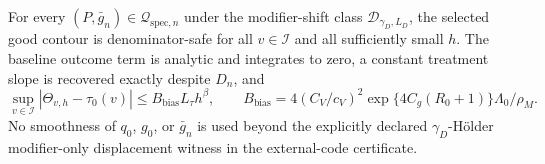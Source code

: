 For every \((P,\bar g_n)\in\mathcal Q_{\mathrm{spec},n}\) under the modifier-shift class \(\mathcal D_{\gamma_D,L_D}\), the selected good contour is denominator-safe for all \(v\in\mathcal I\) and all sufficiently small \(h\). The baseline outcome term is analytic and integrates to zero, a constant treatment slope is recovered exactly despite \(D_n\), and
\[
 \sup_{v\in\mathcal I}|\Theta_{v,h}-\tau_0(v)|
 \le B_{\mathrm{bias}}L_\tau h^\beta,
 \qquad
 B_{\mathrm{bias}}=4(C_V/c_V)^2
 \exp\{4C_g(R_0+1)\}\Lambda_0/\rho_M.
\]
No smoothness of \(q_0\), \(g_0\), or \(\bar g_n\) is used beyond the explicitly declared \(\gamma_D\)-Hölder modifier-only displacement witness in the external-code certificate.
